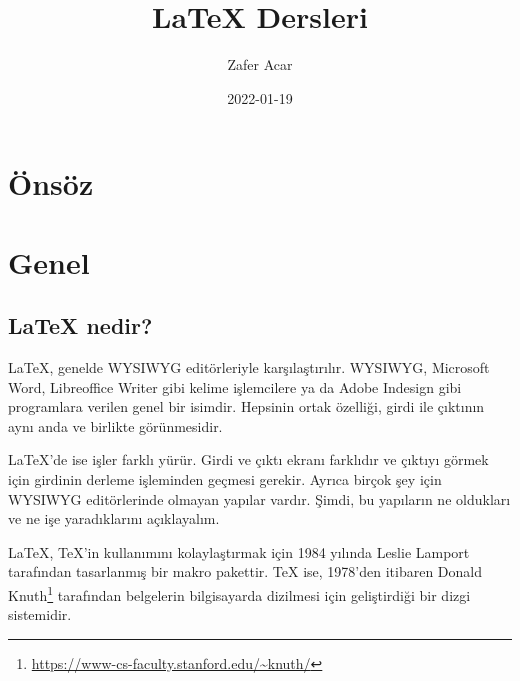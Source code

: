 \documentclass[
  10pt,
]{scrbook}
\title{LaTeX Dersleri}
\author{Zafer Acar}
\date{2022-01-19}
\newenvironment{Shaded}{\begin{snugshade}}{\end{snugshade}}
\newcommand{\BuiltInTok}[1]{#1}
\newcommand{\ExtensionTok}[1]{#1}
\newcommand{\KeywordTok}[1]{\textcolor[rgb]{0.13,0.29,0.53}{\textbf{#1}}}
\newcommand{\NormalTok}[1]{#1}
\newcommand{\SpecialCharTok}[1]{\textcolor[rgb]{0.00,0.00,0.00}{#1}}
\newcommand{\SpecialStringTok}[1]{\textcolor[rgb]{0.31,0.60,0.02}{#1}}
\renewcommand{\href}[2]{#2\footnote{\url{#1}}}
\begin{document}
\maketitle



{
\setcounter{tocdepth}{2}
\tableofcontents
}
\listoffigures
\listoftables
\hypertarget{uxf6nsuxf6z}{%
\chapter*{Önsöz}\label{uxf6nsuxf6z}}


\begin{Shaded}
\end{Shaded}

\citep{talbot2012}

\mainmatter

\hypertarget{genel}{%
\chapter{Genel}\label{genel}}

\hypertarget{latex-nedir}{%
\section{LaTeX nedir?}\label{latex-nedir}}

LaTeX, genelde WYSIWYG editörleriyle karşılaştırılır. WYSIWYG, Microsoft
Word, Libreoffice Writer gibi kelime işlemcilere ya da Adobe Indesign
gibi programlara verilen genel bir isimdir. Hepsinin ortak özelliği,
girdi ile çıktının aynı anda ve birlikte görünmesidir.

LaTeX'de ise işler farklı yürür. Girdi ve çıktı ekranı farklıdır ve
çıktıyı görmek için girdinin derleme işleminden geçmesi gerekir. Ayrıca
birçok şey için WYSIWYG editörlerinde olmayan yapılar vardır. Şimdi, bu
yapıların ne oldukları ve ne işe yaradıklarını açıklayalım.

LaTeX, TeX'in kullanımını kolaylaştırmak için 1984 yılında Leslie
Lamport tarafından tasarlanmış bir makro pakettir. TeX ise, 1978'den
itibaren \href{https://www-cs-faculty.stanford.edu/~knuth/}{Donald
Knuth} tarafından belgelerin bilgisayarda dizilmesi
için geliştirdiği bir dizgi sistemidir.
\end{document}
